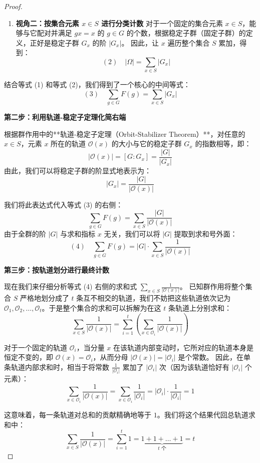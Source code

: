 \documentclass[]{article}
\begin{document}
\begin{proof}
\begin{enumerate}
	\item \textbf{视角二：按集合元素 $x \in S$ 进行分类计数}
	对于一个固定的集合元素 $x \in S$，能够与它配对并满足 $gx = x$ 的 $g \in G$ 的个数，根据稳定子群（固定子群）的定义，正好是稳定子群 $G_x$ 的阶 $|G_x|$。
	因此，让 $x$ 遍历整个集合 $S$ 累加，得到：
	\[ (2) \quad |\Omega| = \sum_{x \in S} |G_x| \]
\end{enumerate}

结合等式 (1) 和等式 (2)，我们得到了一个核心的中间等式：
\[ (3) \quad \sum_{g \in G} F(g) = \sum_{x \in S} |G_x| \]

\bigskip
\noindent \textbf{第二步：利用轨道-稳定子定理化简右端}

根据群作用中的**轨道-稳定子定理（Orbit-Stabilizer Theorem）**，对任意的 $x \in S$，元素 $x$ 所在的轨道 $\mathcal{O}(x)$ 的大小与它的稳定子群 $G_x$ 的指数相等，即：
\[ |\mathcal{O}(x)| = [G : G_x] = \frac{|G|}{|G_x|} \]
由此，我们可以将稳定子群的阶显式地表示为：
\[ |G_x| = \frac{|G|}{|\mathcal{O}(x)|} \]

我们将此表达式代入等式 (3) 的右侧：
\[ \sum_{g \in G} F(g) = \sum_{x \in S} \frac{|G|}{|\mathcal{O}(x)|} \]
由于全群的阶 $|G|$ 与求和指标 $x$ 无关，我们可以将 $|G|$ 提取到求和号外面：
\[ (4) \quad \sum_{g \in G} F(g) = |G| \cdot \sum_{x \in S} \frac{1}{|\mathcal{O}(x)|} \]

\bigskip
\noindent \textbf{第三步：按轨道划分进行最终计数}

现在我们来仔细分析等式 (4) 右侧的求和式 $\sum_{x \in S} \frac{1}{|\mathcal{O}(x)|}$。
已知群作用将整个集合 $S$ 严格地划分成了 $t$ 条互不相交的轨道，我们不妨把这些轨道依次记为 $\mathcal{O}_1, \mathcal{O}_2, \dots, \mathcal{O}_t$。于是整个集合的求和可以拆解为在这 $t$ 条轨道上分别求和：
\[ \sum_{x \in S} \frac{1}{|\mathcal{O}(x)|} = \sum_{i=1}^{t} \left( \sum_{x \in \mathcal{O}_i} \frac{1}{|\mathcal{O}(x)|} \right) \]

对于一个固定的轨道 $\mathcal{O}_i$，当分量 $x$ 在该轨道内部变动时，它所对应的轨道本身是恒定不变的，即 $\mathcal{O}(x) = \mathcal{O}_i$，从而分母 $|\mathcal{O}(x)| = |\mathcal{O}_i|$ 是个常数。
因此，在单条轨道内部求和时，相当于将常数 $\frac{1}{|\mathcal{O}_i|}$ 累加了 $|\mathcal{O}_i|$ 次（因为该轨道恰好有 $|\mathcal{O}_i|$ 个元素）：
\[ \sum_{x \in \mathcal{O}_i} \frac{1}{|\mathcal{O}(x)|} = \sum_{x \in \mathcal{O}_i} \frac{1}{|\mathcal{O}_i|} = |\mathcal{O}_i| \cdot \frac{1}{|\mathcal{O}_i|} = 1 \]

这意味着，每一条轨道对总和的贡献精确地等于 $1$。我们将这个结果代回总轨道求和中：
\[ \sum_{x \in S} \frac{1}{|\mathcal{O}(x)|} = \sum_{i=1}^{t} 1 = \underbrace{1 + 1 + \dots + 1}_{t \text{ 个}} = t \]


\end{proof}
\end{document}
